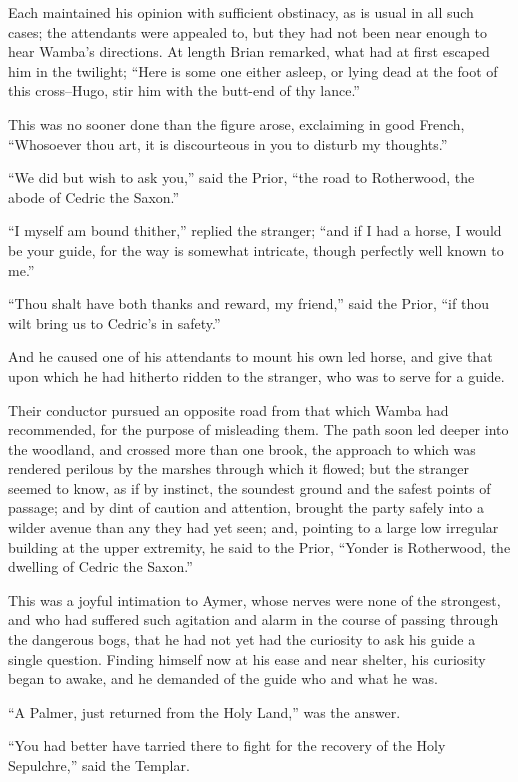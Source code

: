 Each maintained his opinion with sufficient obstinacy, as is usual in
all such cases; the attendants were appealed to, but they had not been
near enough to hear Wamba's directions. At length Brian remarked, what
had at first escaped him in the twilight; ``Here is some one either
asleep, or lying dead at the foot of this cross--Hugo, stir him with the
butt-end of thy lance.''

This was no sooner done than the figure arose, exclaiming in good
French, ``Whosoever thou art, it is discourteous in you to disturb my
thoughts.''

``We did but wish to ask you,'' said the Prior, ``the road to
Rotherwood, the abode of Cedric the Saxon.''

``I myself am bound thither,'' replied the stranger; ``and if I had a
horse, I would be your guide, for the way is somewhat intricate, though
perfectly well known to me.''

``Thou shalt have both thanks and reward, my friend,'' said the Prior,
``if thou wilt bring us to Cedric's in safety.''

And he caused one of his attendants to mount his own led horse, and give
that upon which he had hitherto ridden to the stranger, who was to serve
for a guide.

Their conductor pursued an opposite road from that which Wamba had
recommended, for the purpose of misleading them. The path soon led
deeper into the woodland, and crossed more than one brook, the approach
to which was rendered perilous by the marshes through which it flowed;
but the stranger seemed to know, as if by instinct, the soundest ground
and the safest points of passage; and by dint of caution and attention,
brought the party safely into a wilder avenue than any they had yet
seen; and, pointing to a large low irregular building at the upper
extremity, he said to the Prior, ``Yonder is Rotherwood, the dwelling of
Cedric the Saxon.''

This was a joyful intimation to Aymer, whose nerves were none of the
strongest, and who had suffered such agitation and alarm in the course
of passing through the dangerous bogs, that he had not yet had the
curiosity to ask his guide a single question. Finding himself now at his
ease and near shelter, his curiosity began to awake, and he demanded of
the guide who and what he was.

``A Palmer, just returned from the Holy Land,'' was the answer.

``You had better have tarried there to fight for the recovery of the
Holy Sepulchre,'' said the Templar.

